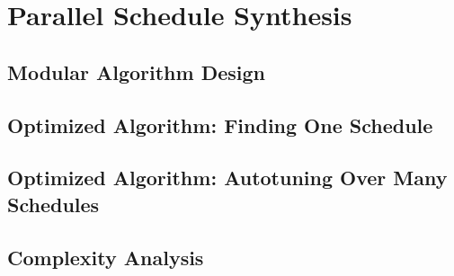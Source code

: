 \chapter{Parallel Schedule Synthesis}

\section{Modular Algorithm Design}
\section{Optimized Algorithm: Finding One Schedule}
\section{Optimized Algorithm: Autotuning Over Many Schedules}
\section{Complexity Analysis}